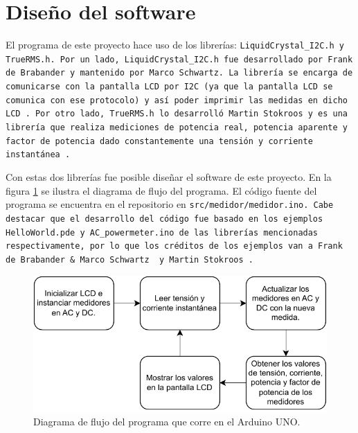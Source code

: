 \section{Diseño del software}
El programa de este proyecto hace uso de los librerías: \tt{LiquidCrystal\_I2C.h} y \tt{TrueRMS.h}. Por un lado, \tt{LiquidCrystal\_I2C.h} fue desarrollado por Frank de Brabander y mantenido por Marco Schwartz. La librería se encarga de comunicarse con la pantalla LCD por I2C (ya que la pantalla LCD se comunica con ese protocolo) y así poder imprimir las medidas en dicho LCD \cite{lcd}. Por otro lado, \tt{TrueRMS.h} lo desarrolló Martin Stokroos y es una librería que realiza mediciones de potencia real, potencia aparente y factor de potencia dado constantemente una tensión y corriente instantánea \cite{rms}.

Con estas dos librerías fue posible diseñar el software de este proyecto. En la figura \ref{fsm} se ilustra el diagrama de flujo del programa. El código fuente del programa se encuentra en el repositorio en \tt{src/medidor/medidor.ino}. Cabe destacar que el desarrollo del código fue basado en los ejemplos \tt{HelloWorld.pde} y \tt{AC\_powermeter.ino} de las librerías mencionadas respectivamente, por lo que los créditos de los ejemplos van a Frank de Brabander \& Marco Schwartz \cite{lcd} y Martin Stokroos \cite{rms}.
\begin{figure}
    \centering
    \includegraphics[width=12cm]{Imagenes/fsm.pdf}
    \caption{Diagrama de flujo del programa que corre en el Arduino UNO.}
    \label{fsm}
\end{figure}




